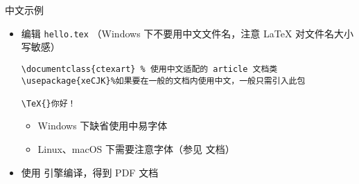 \begin{frame}[fragile]{中文示例}

	\begin{itemize}
		\item 编辑 \texttt{hello.tex} （Windows 下不要用中文文件名，注意
		      \LaTeX{} 对文件名大小写敏感）
		      \lstset{language=[LaTeX]TeX}
		      \begin{lstlisting}[basicstyle=\ttfamily]
\documentclass{ctexart} % 使用中文适配的 article 文档类
\usepackage{xeCJK}%如果要在一般的文档内使用中文，一般只需引入此包

\TeX{}你好！

          \end{lstlisting}
		      \begin{itemize}
			      \item Windows 下缺省使用中易字体
			      \item Linux、macOS 下需要注意字体（参见  文档）
		      \end{itemize}
		\item 使用 \XeLaTeX{} 引擎编译，得到 PDF 文档
		      \begin{center}
		      \end{center}
	\end{itemize}
\end{frame}

